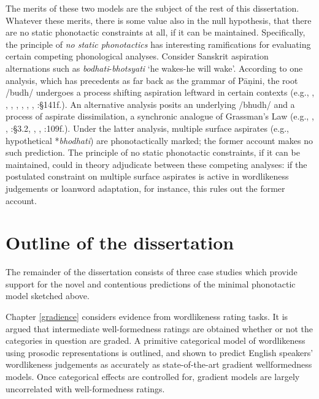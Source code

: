 The merits of these two models are the subject of the rest of this dissertation.
Whatever these merits, there is some value also in the null hypothesis, that there are no static phonotactic constraints at all, if it can be maintained.
Specifically, the principle of \emph{no static phonotactics} has interesting ramifications for evaluating certain competing phonological analyses.
Consider Sanskrit aspiration alternations such as \emph{bodhati}-\emph{bhotsyati} `he wakes-he will wake'.
According to one analysis, which has precedents as far back as the grammar of Pāṇini, the root /budh/ undergoes a process shifting aspiration leftward in certain contexts (e.g., \citealt{Borowsky1983}, \citealt{Hoenigswald1965}, \citealt{Kaye1985}, \citealt{Sag1974}, \citeyear{Sag1976}, \citealt{Schindler1976}, \citealt{Stemberger1980}, \citealt{Whitney1889}:\S141f.).
An alternative analysis posits an underlying /bhudh/ and a process of aspirate dissimilation, a synchronic analogue of Grassman's Law (e.g., \citealt{Anderson1970}, \citealt{Hoard1975}, \citealt{Kiparsky1965}:\S3.2, \citealt{Phelps1973}, \citealt{Phelps1975b}, \citealt{Zwicky1965}:109f.).
Under the latter analysis, multiple surface aspirates (e.g., hypothetical *\emph{bhodhati}) are phonotactically marked; the former account makes no such prediction.
The principle of no static phonotactic constraints, if it can be maintained, could in theory adjudicate between these competing analyses: if the postulated constraint on multiple surface aspirates is active in wordlikeness judgements or loanword adaptation, for instance, this rules out the former account.

\section{Outline of the dissertation}

The remainder of the dissertation consists of three case studies which provide support for the novel and contentious predictions of the minimal phonotactic model sketched above.

Chapter \ref{gradience} considers evidence from wordlikeness rating tasks. It is argued that intermediate well-formedness ratings are obtained whether or not the categories in question are graded. 
A primitive categorical model of wordlikeness using prosodic representations is outlined, and shown to predict English speakers' wordlikeness judgements as accurately as state-of-the-art gradient wellformedness models. 
Once categorical effects are controlled for, gradient models are largely uncorrelated with well-formedness ratings.

